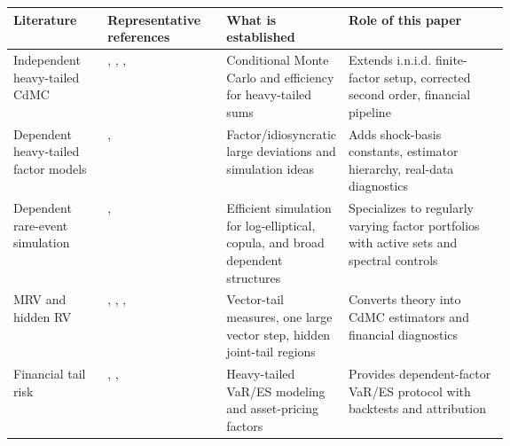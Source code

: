 \begin{tabularx}{\linewidth}{p{0.19\linewidth}p{0.24\linewidth}p{0.22\linewidth}X}
\toprule
Literature & Representative references & What is established & Role of this paper \\
\midrule
Independent heavy-tailed CdMC & \citet{AsmussenKroese2006}, \citet{ChanKroese2011}, \citet{HartingerKortschak2009}, \citet{AsmussenKortschak2015} & Conditional Monte Carlo and efficiency for heavy-tailed sums & Extends i.n.i.d. finite-factor setup, corrected second order, financial pipeline \\
Dependent heavy-tailed factor models & \citet{DjehicheSvensson2007}, \citet{PourbabaeeSolari2019} & Factor/idiosyncratic large deviations and simulation ideas & Adds shock-basis constants, estimator hierarchy, real-data diagnostics \\
Dependent rare-event simulation & \citet{BlanchetRojasNandayapa2011}, \citet{ChengFuhPang2025} & Efficient simulation for log-elliptical, copula, and broad dependent structures & Specializes to regularly varying factor portfolios with active sets and spectral controls \\
MRV and hidden RV & \citet{HultLindskogMikoschSamorodnitsky2005}, \citet{MaulikResnick2004}, \citet{DasMitraResnick2013}, \citet{SamorodnitskySun2016} & Vector-tail measures, one large vector step, hidden joint-tail regions & Converts theory into CdMC estimators and financial diagnostics \\
Financial tail risk & \citet{GlassermanHeidelbergerShahabuddin2002}, \citet{McNeilFreyEmbrechts2015}, \citet{FamaFrench2015} & Heavy-tailed VaR/ES modeling and asset-pricing factors & Provides dependent-factor VaR/ES protocol with backtests and attribution \\
\bottomrule
\end{tabularx}
